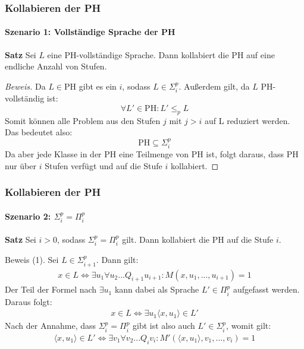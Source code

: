 \begin{frame}
    \frametitle{Kollabieren der PH}
    \framesubtitle{Szenario 1: Vollständige Sprache der PH}
     \begin{block}{\textbf{Satz}}
        Sei $L$ eine PH-vollständige Sprache. Dann kollabiert die PH auf eine endliche Anzahl von Stufen.
    \end{block}
    
    \begin{proof}[Beweis]
        Da $L \in \text{PH}$ gibt es ein $i$, sodass $L \in \Sigma^p_i$.
        Außerdem gilt, da $L$ PH-vollständig ist:
        $$
            \forall L' \in \text{PH}: L' \leq_p L
        $$
        Somit können alle Problem aus den Stufen $j$ mit $j > i$ auf L reduziert werden. Das bedeutet also:
        $$
        \text{PH} \subseteq \Sigma^p_i
        $$
        Da aber jede Klasse in der PH eine Teilmenge von PH ist, folgt daraus, dass PH nur über $i$ Stufen verfügt und auf die Stufe $i$ kollabiert.
    \end{proof}
\end{frame}

\begin{frame}
    \frametitle{Kollabieren der PH}
    \framesubtitle{Szenario 2: $\Sigma^p_i = \Pi^p_i$}
     \begin{block}{\textbf{Satz}}
        Sei $i > 0$, sodass $\Sigma^p_i = \Pi^p_i$ gilt. Dann kollabiert die PH auf die Stufe $i$.
    \end{block}
    
    \begin{block}{Beweis (1).}
         Sei $L \in \Sigma^p_{i+1}$. Dann gilt:
         \small
        \begin{align*}
        x \in L \Leftrightarrow \exists u_1 \forall u_2 ... Q_{i+1}u_{i + 1} : M(x, u_1, ..., u_{i+1}) = 1
        \end{align*}
        Der Teil der Formel nach $\exists u_1$ kann dabei als Sprache $L' \in \Pi^p_i$ aufgefasst werden.
        Daraus folgt:
        \small
        \begin{align*}
        x \in L \Leftrightarrow \exists u_1 \langle x, u_1 \rangle \in L'
        \end{align*}
        Nach der Annahme, dass  $\Sigma^p_i = \Pi^p_i$ gibt ist also auch $L' \in \Sigma^p_i$, womit gilt:
        \small
        \begin{align*}
        \langle x, u_1 \rangle \in L' \Leftrightarrow \exists v_1 \forall v_2 ... Q_i v_i : M'(\langle x, u_1 \rangle, v_1, ..., v_i) = 1 
        \end{align*}
    \end{block}
\end{frame}

